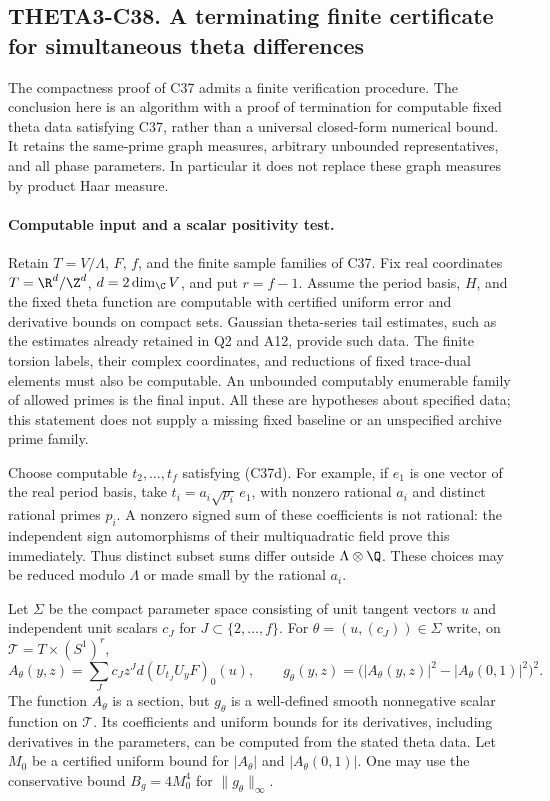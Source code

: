 \subsection{THETA3-C38. A terminating finite certificate for simultaneous theta differences}
\label{C38}

The compactness proof of C37 admits a finite verification procedure.
The conclusion here is an algorithm with a proof of termination for
computable fixed theta data satisfying C37, rather than a universal
closed-form numerical bound.  It retains the same-prime graph
measures, arbitrary unbounded representatives, and all phase
parameters.  In particular it does not replace these graph measures
by product Haar measure.

\paragraph{Computable input and a scalar positivity test.}
Retain $T=V/\Lambda$, $F$, $f$, and the finite sample families of
C37.  Fix real coordinates $T=\R^d/\Z^d$, $d=2\dim_{\C}V$,
and put $r=f-1$.  Assume the period basis, $H$, and the fixed
theta function are computable with certified uniform error and
derivative bounds on compact sets.  Gaussian theta-series tail
estimates, such as the estimates already retained in Q2 and A12,
provide such data.  The finite torsion labels, their complex
coordinates, and reductions of fixed trace-dual elements must also
be computable.  An unbounded computably enumerable family of
allowed primes is the final input.  All these are hypotheses about
specified data; this statement does not supply a missing fixed
baseline or an unspecified archive prime family.

Choose computable $t_2,\ldots,t_f$ satisfying (C37d).  For example,
if $e_1$ is one vector of the real period basis, take
$t_i=a_i\sqrt{p_i}\,e_1$, with nonzero rational $a_i$ and distinct
rational primes $p_i$.  A nonzero signed sum of these coefficients
is not rational: the independent sign automorphisms of their
multiquadratic field prove this immediately.  Thus distinct subset
sums differ outside $\Lambda\otimes\Q$.  These choices may be
reduced modulo $\Lambda$ or made small by the rational $a_i$.

Let $\Sigma$ be the compact parameter space consisting of unit
tangent vectors $u$ and independent unit scalars $c_J$ for
$J\subset\{2,\ldots,f\}$.  For $\theta=(u,(c_J))\in\Sigma$
write, on $\mathcal T=T\times(S^1)^r$,
\[
 A_\theta(y,z)=\sum_J c_Jz^Jd(U_{t_J}U_yF)_0(u),
 \qquad
 g_\theta(y,z)=
       \bigl(|A_\theta(y,z)|^2-|A_\theta(0,1)|^2\bigr)^2.
 \tag{C38a}
\]
The function $A_\theta$ is a section, but $g_\theta$ is a
well-defined smooth nonnegative scalar function on $\mathcal T$.
Its coefficients and uniform bounds for its derivatives, including
derivatives in the parameters, can be computed from the stated
theta data.  Let $M_0$ be a certified uniform bound for
$|A_\theta|$ and $|A_\theta(0,1)|$.  One may use the conservative
bound $B_g=4M_0^4$ for $\|g_\theta\|_\infty$.

